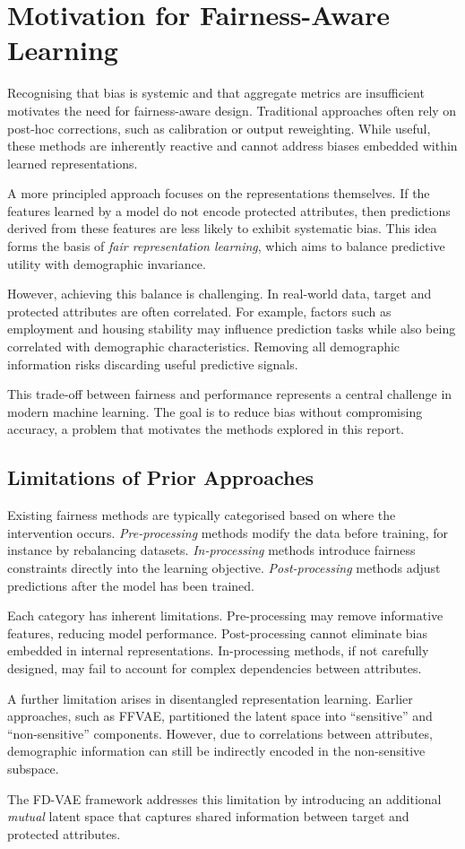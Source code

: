 \section{Motivation for Fairness-Aware Learning}
\label{sec:motivation}

Recognising that bias is systemic and that aggregate metrics are
insufficient motivates the need for fairness-aware design. Traditional
approaches often rely on post-hoc corrections, such as calibration or
output reweighting. While useful, these methods are inherently reactive
and cannot address biases embedded within learned representations.

A more principled approach focuses on the representations themselves.
If the features learned by a model do not encode protected attributes,
then predictions derived from these features are less likely to exhibit
systematic bias. This idea forms the basis of \emph{fair representation
learning}, which aims to balance predictive utility with demographic
invariance.

However, achieving this balance is challenging. In real-world data,
target and protected attributes are often correlated. For example,
factors such as employment and housing stability may influence prediction
tasks while also being correlated with demographic characteristics.
Removing all demographic information risks discarding useful predictive
signals.

This trade-off between fairness and performance represents a central
challenge in modern machine learning. The goal is to reduce bias without
compromising accuracy, a problem that motivates the methods explored in
this report.

\subsection{Limitations of Prior Approaches}

Existing fairness methods are typically categorised based on where the
intervention occurs. \emph{Pre-processing} methods modify the data before
training, for instance by rebalancing datasets. \emph{In-processing}
methods introduce fairness constraints directly into the learning
objective. \emph{Post-processing} methods adjust predictions after the
model has been trained.

Each category has inherent limitations. Pre-processing may remove
informative features, reducing model performance. Post-processing cannot
eliminate bias embedded in internal representations. In-processing
methods, if not carefully designed, may fail to account for complex
dependencies between attributes.

A further limitation arises in disentangled representation learning.
Earlier approaches, such as FFVAE, partitioned the latent space into
``sensitive'' and ``non-sensitive'' components. However, due to
correlations between attributes, demographic information can still be
indirectly encoded in the non-sensitive subspace.

The FD-VAE framework addresses this limitation by introducing an
additional \emph{mutual} latent space that captures shared information
between target and protected attributes.

